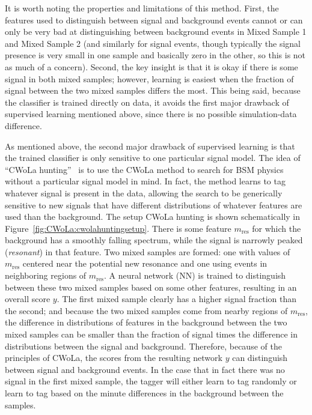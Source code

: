 It is worth noting the properties and limitations of this method.
First, the features used to distinguish between signal and background events cannot or can only be very bad at distinguishing between background events in Mixed Sample 1 and Mixed Sample 2 (and similarly for signal events, though typically the signal presence is very small in one sample and basically zero in the other, so this is not as much of a concern).
Second, the key insight is that it is okay if there is some signal in both mixed samples; however, learning is easiest when the fraction of signal between the two mixed samples differs the most.
This being said, because the classifier is trained directly on data, it avoids the first major drawback of supervised learning mentioned above, since there is no possible simulation-data difference.

As mentioned above, the second major drawback of supervised learning is that the trained classifier is only sensitive to one particular signal model.
The idea of ``CWoLa hunting''~\cite{Collins:2018epr,Collins:2019jip} is to use the CWoLa method to search for BSM physics without a particular signal model in mind.
In fact, the method learns to tag whatever signal is present in the data, allowing the search to be generically sensitive to new signals that have different distributions of whatever features are used than the background.
The setup CWoLa hunting is shown schematically in Figure~\ref{fig:CWoLa:cwolahuntingsetup}.
There is some feature $m_\text{res}$ for which the background has a smoothly falling spectrum, while the signal is narrowly peaked (\textit{resonant}) in that feature.
Two mixed samples are formed: one with values of $m_\text{res}$ centered near the potential new resonance and one using events in neighboring regions of $m_\text{res}$.
A neural network (NN) is trained to distinguish between these two mixed samples based on some other features, resulting in an overall score $y$.
The first mixed sample clearly has a higher signal fraction than the second;
and because the two mixed samples come from nearby regions of $m_\text{res}$, the difference in distributions of features in the background between the two mixed samples can be smaller than the fraction of signal times the difference in distributions between the signal and background.
Therefore, because of the principles of CWoLa, the scores from the resulting network $y$ can distinguish between signal and background events. 
In the case that in fact there was no signal in the first mixed sample, the tagger will either learn to tag randomly or learn to tag based on the minute differences in the background between the samples.
